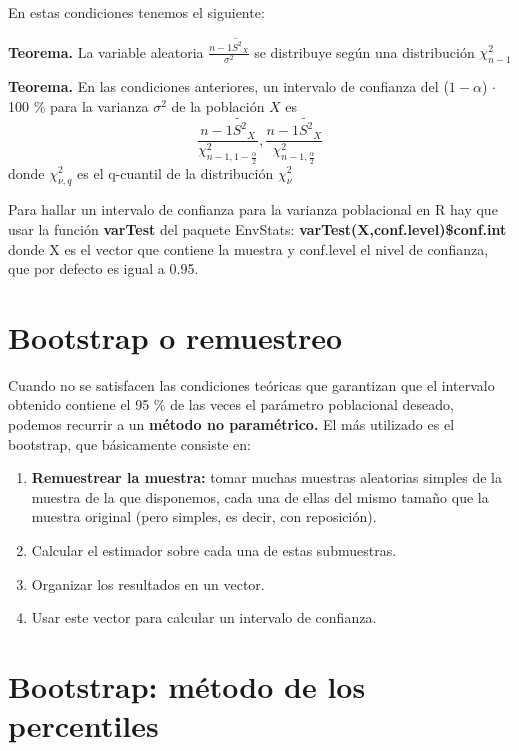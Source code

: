 \documentclass[
]{article}
\providecommand{\tightlist}{%
  \setlength{\itemsep}{0pt}\setlength{\parskip}{0pt}}
\begin{document}
En estas condiciones tenemos el siguiente:

\textbf{Teorema.} La variable aleatoria
\(\frac{n-1\tilde{S^2}_X}{\sigma^2}\) se distribuye según una
distribución \(\chi^2_{n-1}\)

\textbf{Teorema.} En las condiciones anteriores, un intervalo de
confianza del (\(1-\alpha\)) \(\cdot\) 100 \% para la varianza
\(\sigma^2\) de la población \(X\) es
\[\frac{n-1\tilde{S^2}_X}{\chi^2_{n-1,1-\frac{\alpha}{2}}},\frac{n-1\tilde{S^2}_X}{\chi^2_{n-1,\frac{\alpha}{2}}}\]
donde \(\chi^2_{\nu,q}\) es el q-cuantil de la distribución
\(\chi^2_\nu\)

Para hallar un intervalo de confianza para la varianza poblacional en R
hay que usar la función \textbf{varTest} del paquete EnvStats:
\textbf{varTest(X,conf.level)\$conf.int} donde X es el vector que
contiene la muestra y conf.level el nivel de confianza, que por defecto
es igual a 0.95.

\hypertarget{bootstrap-o-remuestreo}{%
\section{Bootstrap o remuestreo}\label{bootstrap-o-remuestreo}}

Cuando no se satisfacen las condiciones teóricas que garantizan que el
intervalo obtenido contiene el 95 \% de las veces el parámetro
poblacional deseado, podemos recurrir a un \textbf{método no
paramétrico.} El más utilizado es el bootstrap, que básicamente consiste
en:

\begin{enumerate}
\def\labelenumi{\arabic{enumi}.}
\tightlist
\item
  \textbf{Remuestrear la muestra:} tomar muchas muestras aleatorias
  simples de la muestra de la que disponemos, cada una de ellas del
  mismo tamaño que la muestra original (pero simples, es decir, con
  reposición).
\item
  Calcular el estimador sobre cada una de estas submuestras.
\item
  Organizar los resultados en un vector.
\item
  Usar este vector para calcular un intervalo de confianza.
\end{enumerate}

\hypertarget{bootstrap-muxe9todo-de-los-percentiles}{%
\section{Bootstrap: método de los
percentiles}\label{bootstrap-muxe9todo-de-los-percentiles}}
\end{document}
